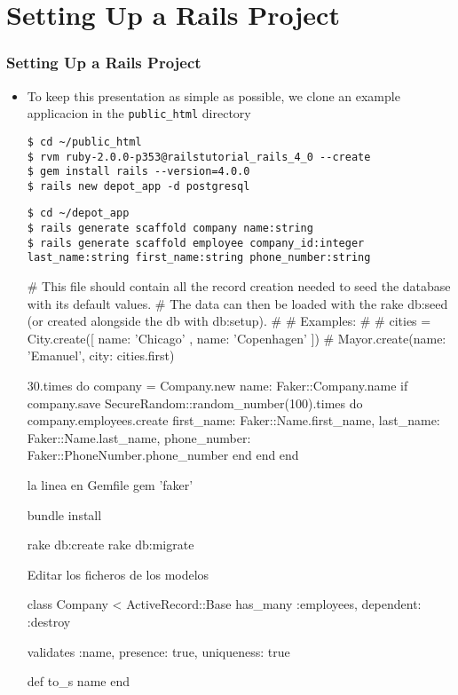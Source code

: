 \documentclass{beamer}
\begin{document}
\section{Setting Up a Rails Project}
\begin{frame}
\frametitle{Setting Up a Rails Project}
\begin{itemize}
\item To keep this presentation as simple as possible, we clone an example applicacion in the \texttt{public\_html} directory 

\lstset{language=shell, escapechar=!}
\begin{lstlisting}[escapechar=!]
$ cd ~/public_html
$ rvm ruby-2.0.0-p353@railstutorial_rails_4_0 --create
$ gem install rails --version=4.0.0
$ rails new depot_app -d postgresql
\end{lstlisting}

\lstset{language=shell, escapechar=!}
\begin{lstlisting}[escapechar=!]
$ cd ~/depot_app
$ rails generate scaffold company name:string
$ rails generate scaffold employee company_id:integer last_name:string first_name:string phone_number:string
\end{lstlisting}

# This file should contain all the record creation needed to seed the database with its default values.
# The data can then be loaded with the rake db:seed (or created alongside the db with db:setup).
#
# Examples:
#
#   cities = City.create([{ name: 'Chicago' }, { name: 'Copenhagen' }])
#   Mayor.create(name: 'Emanuel', city: cities.first)

30.times do
  company = Company.new name: Faker::Company.name
  if company.save
    SecureRandom::random_number(100).times do
      company.employees.create first_name: Faker::Name.first_name,
        last_name: Faker::Name.last_name,
        phone_number: Faker::PhoneNumber.phone_number
    end
  end
end

la linea en Gemfile gem 'faker'

bundle install

rake db:create
rake db:migrate

Editar los ficheros de los modelos

class Company < ActiveRecord::Base
  has_many :employees, dependent: :destroy

  validates :name,
    presence: true,
    uniqueness: true

  def to_s
    name
  end


\end{itemize}
\end{frame}
\end{document}

